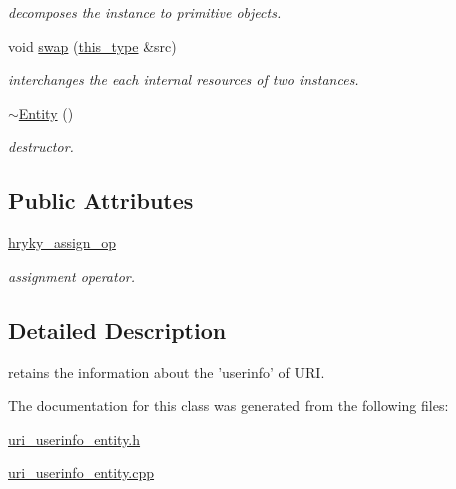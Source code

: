 \begin{DoxyCompactItemize}
\begin{DoxyCompactList}\small\item\em decomposes the instance to primitive objects. \end{DoxyCompactList}\item 
\hypertarget{classhryky_1_1uri_1_1userinfo_1_1_entity_a0c18a51ec96f3d71de186750fc28acf2}{void \hyperlink{classhryky_1_1uri_1_1userinfo_1_1_entity_a0c18a51ec96f3d71de186750fc28acf2}{swap} (\hyperlink{classhryky_1_1uri_1_1userinfo_1_1_entity_ac4680728d50e274ba5073c9d25c42c06}{this\-\_\-type} \&src)}\label{classhryky_1_1uri_1_1userinfo_1_1_entity_a0c18a51ec96f3d71de186750fc28acf2}

\begin{DoxyCompactList}\small\item\em interchanges the each internal resources of two instances. \end{DoxyCompactList}\item 
\hypertarget{classhryky_1_1uri_1_1userinfo_1_1_entity_a29dd0c7ec68465ad9db1bc74f023fa48}{\hyperlink{classhryky_1_1uri_1_1userinfo_1_1_entity_a29dd0c7ec68465ad9db1bc74f023fa48}{$\sim$\-Entity} ()}\label{classhryky_1_1uri_1_1userinfo_1_1_entity_a29dd0c7ec68465ad9db1bc74f023fa48}

\begin{DoxyCompactList}\small\item\em destructor. \end{DoxyCompactList}\end{DoxyCompactItemize}
\subsection*{Public Attributes}
\begin{DoxyCompactItemize}
\item 
\hypertarget{classhryky_1_1uri_1_1userinfo_1_1_entity_a7213ac05a156bf2f179db6a4231bfa3c}{\hyperlink{classhryky_1_1uri_1_1userinfo_1_1_entity_a7213ac05a156bf2f179db6a4231bfa3c}{hryky\-\_\-assign\-\_\-op}}\label{classhryky_1_1uri_1_1userinfo_1_1_entity_a7213ac05a156bf2f179db6a4231bfa3c}

\begin{DoxyCompactList}\small\item\em assignment operator. \end{DoxyCompactList}\end{DoxyCompactItemize}


\subsection{Detailed Description}
retains the information about the 'userinfo' of U\-R\-I. 

The documentation for this class was generated from the following files\-:\begin{DoxyCompactItemize}
\item 
\hyperlink{uri__userinfo__entity_8h}{uri\-\_\-userinfo\-\_\-entity.\-h}\item 
\hyperlink{uri__userinfo__entity_8cpp}{uri\-\_\-userinfo\-\_\-entity.\-cpp}\end{DoxyCompactItemize}
